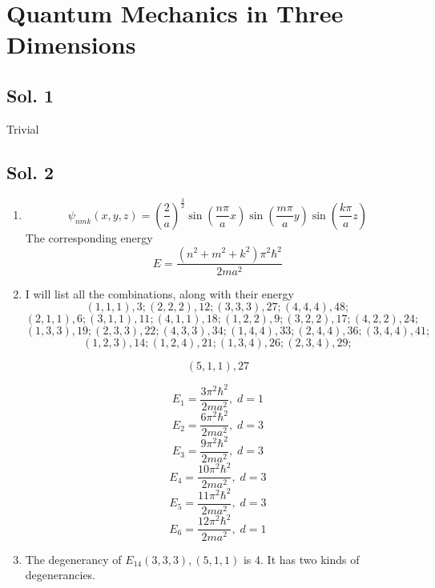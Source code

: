 \section{Quantum Mechanics in Three Dimensions}
\subsection*{Sol. 1}
Trivial

\subsection*{Sol. 2}

\begin{enumerate}
    \item 
    $$
    \psi_{nmk}(x,y,z)
    =\left(\frac{2}{a}\right)^{\frac{3}{2}}
    \sin\left(\frac{n\pi}{a}x\right)
    \sin\left(\frac{m\pi}{a}y\right)
    \sin\left(\frac{k\pi}{a}z\right)
    $$
    The corresponding energy 
    $$
    E = \frac{(n^2+m^2+k^2)\pi^2\hbar^2}{2ma^2}
    $$
    \item 
     I will list all the combinations, along with their energy
    $$
    (1,1,1), 3;
    (2,2,2), 12;
    (3,3,3), 27;
    (4,4,4), 48;
    $$
    $$
    (2,1,1), 6;
    (3,1,1), 11;
    (4,1,1), 18;
    (1,2,2), 9;
    (3,2,2), 17;
    (4,2,2), 24;
    $$
    $$
    (1,3,3), 19;
    (2,3,3), 22;
    (4,3,3), 34;
    (1,4,4), 33;
    (2,4,4), 36;
    (3,4,4), 41;
    $$
    $$
    (1,2,3), 14;
    (1,2,4), 21;
    (1,3,4), 26;
    (2,3,4), 29;
    $$

    $$
    (5,1,1), 27
    $$
    

    
    $$
    E_1=\frac{3\pi^2\hbar^2}{2ma^2},\;d=1
    $$
    $$
    E_2=\frac{6\pi^2\hbar^2}{2ma^2},\;d=3
    $$
    $$
    E_3=\frac{9\pi^2\hbar^2}{2ma^2},\;d=3
    $$
    $$
    E_4=\frac{10\pi^2\hbar^2}{2ma^2},\;d=3
    $$
    $$
    E_5=\frac{11\pi^2\hbar^2}{2ma^2},\;d=3
    $$
    $$
    E_6=\frac{12\pi^2\hbar^2}{2ma^2},\;d=1
    $$
    \item 
    The degenerancy of $E_{14} (3,3,3), (5,1,1)$ is 4. It has two kinds of degenerancies.
    
\end{enumerate}

